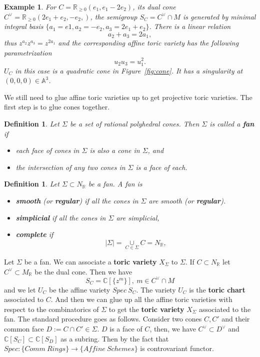 \documentclass[11pt]{article}
\newtheorem{dfn}[thm]{Definition}
\newtheorem{ex}[thm]{Example}
\begin{document}
\begin{ex}
	For $C=\mathbb{R}_{\geq 0}({e_1,e_1-2e_2})$, its dual cone $C^\vee=\mathbb{R}_{\geq 0}(2e_1+e_2, -e_2,)$, the semigroup $S_C=C^\vee\cap M$ is generated by minimal integral basis $\{ a_1= e1,a_2=-e_2, a_3=2e_1+e_2\}$. There is a linear relation 
	\begin{equation*}
		a_2+a_3=2a_1,
	\end{equation*}
	thus $z^{a_2}z^{a_3}=z^{2a_1}$ and the corresponding affine toric variety has the following parametrization
	\begin{equation*}
		u_2u_3=u_1^2.
	\end{equation*}
	$U_C$ in this case is a quadratic cone  in Figure~\ref{fig:cone}. It has a singularity at $(0,0,0)\in \mathbb{A}^3$.
\end{ex}
We still need to glue affine toric varieties up to get projective toric varieties. The first step is to glue  cones together.
\begin{dfn}
Let $\Sigma$ be a set of rational polyhedral cones. Then $\Sigma$ is called a \textbf{fan} if 
\begin{itemize}
\item each face of cones in $\Sigma$ is also a cone in $\Sigma$, and
\item the intersection of any two cones in $\Sigma$ is a face of each.
\end{itemize}
\end{dfn}

\begin{dfn}\label{fan} 
Let $\Sigma\subset N_{\mathbb{R}}$ be a fan.
A fan is 
\begin{itemize}
\item
	\textbf{smooth} (or \textbf{regular}) if all the cones in $\Sigma$ are smooth (or \textbf{regular}).
\item
	\textbf{simplicial} if all the cones in $\Sigma$ are simplicial,
\item 
	\textbf{complete} if
	\begin{equation*}
		|\Sigma|=\underset{C\in\Sigma}{\cup}C=N_\mathbb{R},
	\end{equation*}
\end{itemize}
\end{dfn}

Let $\Sigma$ be a fan. We can associate a \textbf{toric variety} $X_\Sigma$ to $\Sigma$. If $C\subset N_\mathbb{R}$ let $C^\vee\subset M_\mathbb{R}$ be the dual cone. Then we have 
\begin{equation*}
S_C=\mathbb{C}[\{z^{m}\}],\  m\in C^\vee\cap M
\end{equation*}
and we let $U_C$ be the affine variety $Spec\ S_C$. The variety $U_C$ is the \textbf{toric chart} associated to $C$.
And then we can glue up all the affine toric varieties with respect to the combinatorics of $\Sigma$ to get the \textbf{toric variety} $X_\Sigma$ associated to the fan. The standard procedure goes as follows.
Consider two cones $C, C'$ and their common face $D:=C\cap C'\in \Sigma$. $D$ is a face of $C$, then, we have $C^\vee\subset D^\vee$ and $\mathbb{C}[{S_C}]\subset \mathbb{C}[{S_D}]$ as a subring. Then by the fact that $Spec: \{Comm\ Rings\}\rightarrow \{Affine\ Schemes\}$ is controvariant functor.
\end{document}
